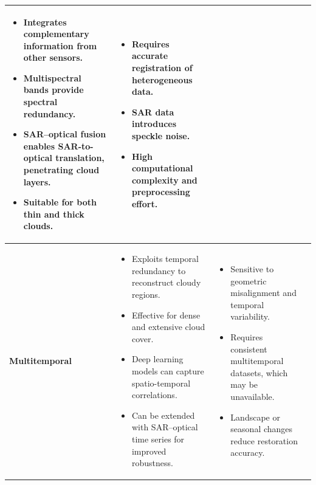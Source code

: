 \begin{table}[ht]
\begin{adjustbox}{max width=\textwidth, keepaspectratio=false}
\begin{tabular}{p{2.5cm} p{6cm} p{6cm} p{3cm}}
\begin{itemize}[nosep,leftmargin=*]
  \item Integrates complementary information from other sensors.
  \item Multispectral bands provide spectral redundancy.
  \item SAR–optical fusion enables SAR-to-optical translation, penetrating cloud layers.
  \item Suitable for both thin and thick clouds.
\end{itemize} &
\begin{itemize}[nosep,leftmargin=*]
  \item Requires accurate registration of heterogeneous data.
  \item SAR data introduces speckle noise.
  \item High computational complexity and preprocessing effort.
\end{itemize} &
\cite{A_cGAN_fuse_sar_MS_CR} \cite{sar2opt_cGAN_Optim_oppr_limits} \cite{syn_ms_sar_opt_MT_cGAN} \cite{CR_SEN2_dRNN} \cite{GAN_gen_synt_MS} \cite{s2o_ViT_cGAN} \cite{CR_RS_GAN_s2o} \cite{s2o_Thermodynamics} \cite{c_diffusion_s2o} \cite{s2o_color_super_diff} \cite{S2MS_GAN} \cite{SAR_DeCR} \\
\midrule
\textbf{Multitemporal} &
\begin{itemize}[nosep,leftmargin=*]
  \item Exploits temporal redundancy to reconstruct cloudy regions.
  \item Effective for dense and extensive cloud cover.
  \item Deep learning models can capture spatio-temporal correlations.
  \item Can be extended with SAR–optical time series for improved robustness.
\end{itemize} &
\begin{itemize}[nosep,leftmargin=*]
  \item Sensitive to geometric misalignment and temporal variability.
  \item Requires consistent multitemporal datasets, which may be unavailable.
  \item Landscape or seasonal changes reduce restoration accuracy.
\end{itemize} &
\cite{syn_ms_sar_opt_MT_cGAN} \cite{CR_RS_spati_atten_GAN} \cite{UnCRtainTS} \cite{assessing_MT_cGANS_s2o_crop} \cite{DiffCR} \\
\bottomrule
\end{tabular}
\end{adjustbox}
\end{table}

